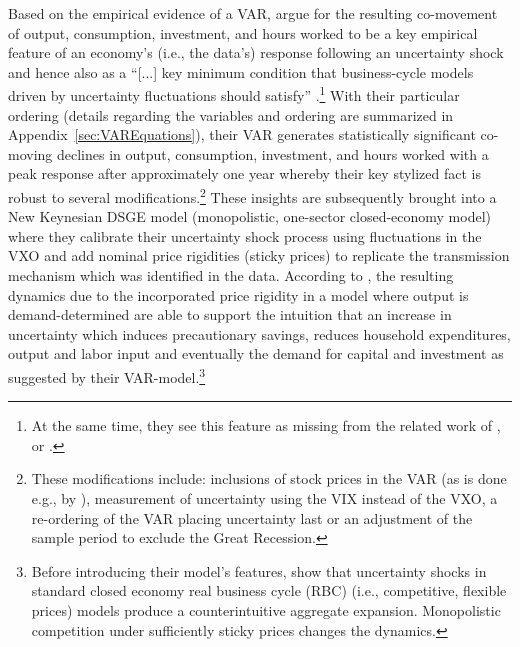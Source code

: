 \documentclass[a4paper,11pt,listof=nochaptergap,oneside,pointednumbers,bibtotoc,bigheadings,liststotoc,hidelinks]{scrbook}
\theoremstyle{mysatz}
\theoremstyle{mydefinition}
\theoremstyle{mytheorem}
\theoremstyle{mybemerkung}
\begin{document}
Based on the empirical evidence of a VAR, \citet{basuandbundick:17} argue for the resulting co-movement of output, consumption, investment, and hours worked to be a key empirical feature of an economy's (i.e., the data's) response following an uncertainty shock and hence also as a ``[...] key minimum condition that business-cycle models driven by uncertainty fluctuations should satisfy'' \citep[p. 937]{basuandbundick:17}.\footnote{At the same time, they see this feature as missing from the related work of \citet{bloom:09}, \citet{bachmannandbayer:13} or \citet{gilchristetal:14}. } With their particular ordering (details regarding the variables and ordering are summarized in Appendix~\ref{sec:VAREquations}), their VAR generates statistically significant co-moving declines in output, consumption, investment, and hours worked with a peak response after approximately one year whereby their key stylized fact is robust to several modifications.\footnote{These modifications include: inclusions of stock prices in the VAR (as is done e.g., by \citet{bloom:09}), measurement of uncertainty using the VIX instead of the VXO, a re-ordering of the VAR placing uncertainty last or an adjustment of the sample period to exclude the Great Recession.} These insights are subsequently brought into a New Keynesian DSGE model (monopolistic, one-sector closed-economy model) where they calibrate their uncertainty shock process using fluctuations in the VXO and add nominal price rigidities (sticky prices) to replicate the transmission mechanism which was identified in the data. According to \citet{basuandbundick:17}, the resulting dynamics due to the incorporated price rigidity in a model where output is demand-determined are able to support the intuition that an increase in uncertainty which induces precautionary savings, reduces household expenditures, output and labor input and eventually the demand for capital and investment as suggested by their VAR-model.\footnote{Before introducing their model's features, \citet{basuandbundick:17} show that uncertainty shocks in standard closed economy real business cycle (RBC) (i.e., competitive, flexible prices) models produce a counterintuitive aggregate expansion. Monopolistic competition under sufficiently sticky prices changes the dynamics.}\\
\end{document}
